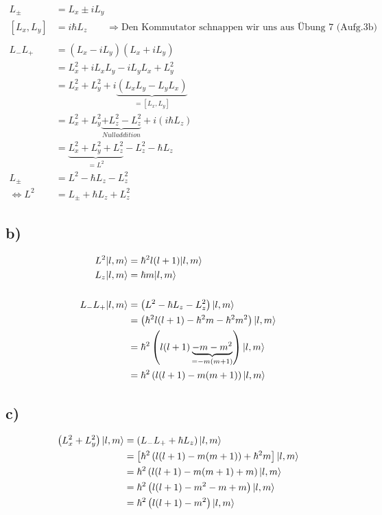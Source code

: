     \begin{align}
        L_{\pm} &= L_x \pm iL_y\\
        \left[ L_x,L_y \right] &= i\hbar L_z \qquad \Rightarrow \text{Den Kommutator schnappen wir uns aus Übung 7 (Aufg.3b)}\\
        \\
        L_- L_+ &= \left( L_x - iL_y \right)\left( L_x + iL_y \right)\\
        &= L_x^2 + iL_x L_y - iL_y L_x + L_y^2\\
        &= L_x^2 + L_y^2 + i\underbrace{\left( L_x L_y - L_y L_x \right)}_{=\left[L_x,L_y\right]}\\
        &= L_x^2 + L_y^2 \underbrace{+ L_z^2 - L_z^2}_{Nulladdition} + i \left( i\hbar L_z\right)\\
        &= \underbrace{L_x^2 + L_y^2 + L_z^2}_{=L^2} - L_z^2 - \hbar L_z\\
        L_{\pm} &= L^2 - \hbar L_z - L_z^2\\
        \Leftrightarrow L^2 &= L_{\pm} + \hbar L_z + L_z^2
    \end{align}

\subsection{b)}

    \begin{align}
        L^2 \lvert l,m\rangle &= \hbar^2 l(l+1) \lvert l,m\rangle\\
        L_z \lvert l,m\rangle &= \hbar m \lvert l,m\rangle\\
        \\
        L_- L_+ \lvert l,m\rangle &= \left( L^2 - \hbar L_z - L_z^2 \right) \lvert l,m\rangle\\
        &= \left( \hbar^2 l(l+1) - \hbar^2 m - \hbar^2 m^2 \right) \lvert l,m\rangle\\
        &= \hbar^2 \left( l(l+1) \underbrace{- m - m^2}_{=-m(m+1)} \right) \lvert l,m\rangle\\
        &= \hbar^2 \left( l(l+1) -m(m+1) \right) \lvert l,m\rangle
    \end{align}

\subsection{c)}

    \begin{align}
        \left( L_x^2 + L_y^2 \right) \lvert l,m\rangle &= \left( L_- L_+ + \hbar L_z \right) \lvert l,m\rangle\\
        &= \left[ \hbar^2 \left( l(l+1) - m(m+1) \right) + \hbar^2 m  \right] \lvert l,m\rangle\\
        &= \hbar^2 \left( l(l+1) - m(m+1) + m \right) \lvert l,m\rangle\\
        &= \hbar^2 \left( l(l+1) - m^2 -m + m \right) \lvert l,m\rangle\\
        &= \hbar^2 \left( l(l+1) - m^2 \right) \lvert l,m\rangle
    \end{align}

